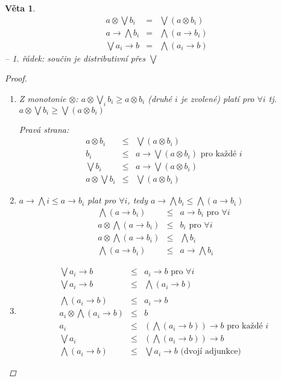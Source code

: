 \documentclass[10pt, a4paper, titlepage]{article}
\theoremstyle{note}
\newtheorem{veta}{Věta}
\begin{document}
\begin{veta}
\begin{eqnarray}
a\otimes \bigvee b_{i} &=&\bigvee(a\otimes b_{i}) \nonumber\\
a\rightarrow\bigwedge b_{i} &=&\bigwedge(a\rightarrow b_{i})\nonumber\\
\bigvee a_{i} \rightarrow b &=&\bigwedge(a_{i}\rightarrow b) \nonumber
\end{eqnarray}
-- 1. řádek: součin je distributivní přes $\bigvee$
\begin{proof}
\begin{enumerate}
\item Z monotonie $\otimes$: $a\otimes \bigvee_{i} b_{i}  \geq a\otimes b_{i}$ (druhé $i$ je zvolené) platí pro $\forall i$ tj. $a\otimes\bigvee b_{i} \geq \bigvee(a\otimes b_{i})$

Pravá strana:\begin{eqnarray}
a\otimes b_{i}&\leq& \bigvee(a\otimes b_{i})\nonumber \\
b_{i}&\leq&a\rightarrow\bigvee(a\otimes b_{i}) \text{ pro každé }i\nonumber \\
\bigvee b_{i}&\leq&a\rightarrow\bigvee(a\otimes b_{i})\nonumber\\
a\otimes \bigvee b_{i}&\leq&\bigvee(a\otimes b_{i})\nonumber
\end{eqnarray}
\item $a\rightarrow \bigwedge{i} \leq a\rightarrow b_{i}$ plat pro $\forall i$, tedy $a\rightarrow \bigwedge b_{i} \leq \bigwedge(a\rightarrow b_{i})$
\begin{eqnarray}
\bigwedge(a\rightarrow b_{i})&\leq& a\rightarrow b_{i} \text{ pro } \forall i\nonumber\\
a\otimes \bigwedge(a\rightarrow b_{i})&\leq& b_{i} \text{ pro } \forall i\nonumber\\
a\otimes \bigwedge(a\rightarrow b_{i})&\leq& \bigwedge b_{i} \nonumber\\
\bigwedge(a\rightarrow b_{i})&\leq& a\rightarrow \bigwedge b_{i} \nonumber
\end{eqnarray}
\item \begin{eqnarray}
\bigvee a_{i} \rightarrow b&\leq&a_{i}\rightarrow b \text{ pro } \forall i\nonumber\\
\bigvee a_{i} \rightarrow b&\leq& \bigwedge(a_{i}\rightarrow b) \nonumber\\\nonumber\\
\bigwedge(a_{i}\rightarrow b)&\leq& a_{i}\rightarrow b\nonumber\\
a_{i}\otimes \bigwedge(a_{i}\rightarrow b)&\leq&b\nonumber\\
a_{i} &\leq&(\bigwedge(a_{i}\rightarrow b)) \rightarrow b \text{ pro každé }i \nonumber\\
\bigvee a_{i} &\leq&(\bigwedge(a_{i}\rightarrow b)) \rightarrow b \nonumber\\
\bigwedge(a_{i}\rightarrow b) &\leq&\bigvee a_{i}\rightarrow b\text{   (dvojí adjunkce)} \nonumber
\end{eqnarray}
\end{enumerate}
\end{proof}
\end{veta}
\end{document}
